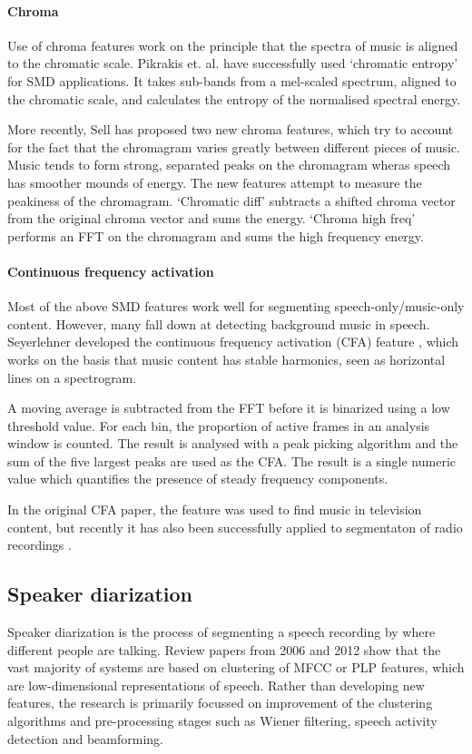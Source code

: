 \paragraph{Chroma}
Use of chroma features work on the principle that the spectra of music is
aligned to the chromatic scale. Pikrakis et. al.
\citep{Pikrakis2006,Pikrakis2008} have successfully used `chromatic entropy' for
SMD applications. It takes sub-bands from a mel-scaled spectrum, aligned to the
chromatic scale, and calculates the entropy of the normalised spectral energy.

More recently, Sell \citep{Sell2014} has proposed two new chroma features, which
try to account for the fact that the chromagram varies greatly between
different pieces of music. Music tends to form strong, separated peaks on the
chromagram wheras speech has smoother mounds of energy. The new features
attempt to measure the peakiness of the chromagram. `Chromatic diff' subtracts
a shifted chroma vector from the original chroma vector and sums the energy. 
`Chroma high freq' performs an FFT on the chromagram and sums the high
frequency energy.

\paragraph{Continuous frequency activation}
Most of the above SMD features work well for segmenting speech-only/music-only
content. However, many fall down at detecting background music in speech.
Seyerlehner developed the continuous frequency activation (CFA) feature
\citep{Seyerlehner2007}, which works on the basis that music content has stable
harmonics, seen as horizontal lines on a spectrogram.

A moving average is subtracted from the FFT before it is binarized using a low
threshold value. For each bin, the proportion of active frames in an analysis
window is counted. The result is analysed with a peak picking algorithm and the
sum of the five largest peaks are used as the CFA. The result is a single
numeric value which quantifies the presence of steady frequency components.

In the original CFA paper, the feature was used to find music in television
content, but recently it has also been successfully applied to segmentaton of
radio recordings \citep{Wieser2014}.

\subsection{Speaker diarization}
Speaker diarization is the process of segmenting a speech recording by where
different people are talking. Review papers from 2006 \citep{Tranter2006} and
2012 \citep{AngueraMiro2012} show that the vast majority of systems are based on
clustering of MFCC or PLP features, which are low-dimensional representations
of speech. Rather than developing new features, the research is primarily
focussed on improvement of the clustering algorithms and pre-processing stages
such as Wiener filtering, speech activity detection and beamforming.

